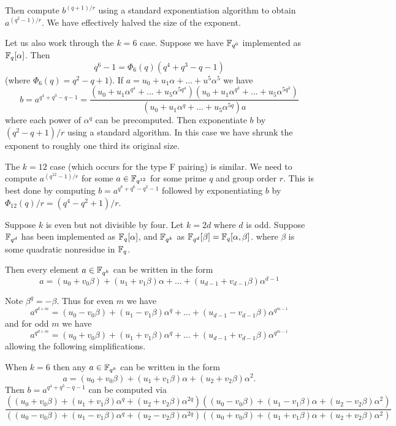 Then compute $b^{(q+1)/r}$ using a standard exponentiation algorithm
to obtain $a^{(q^2-1)/r}$. We have effectively halved the size of the exponent.

Let us also work through the $k = 6$ case. Suppose we have $\mathbb{F}_{q^6}$
implemented as $\mathbb{F}_q[\alpha]$. Then
\[ q^6 - 1 = \Phi_6(q) (q^4 + q^3 - q - 1)\]
(where $\Phi_6(q) = q^2 - q + 1$).
If $a = u_0 + u_1 \alpha + ... + u^5 \alpha^5$ we have
\[ b =
a^{q^4 + q^3 - q - 1}
= \frac{
(u_0 + u_1 \alpha^{q^4} + ... + u_5 \alpha^{5q^4})
(u_0 + u_1 \alpha^{q^3} + ... + u_5 \alpha^{5q^3})}
{
(u_0 + u_1 \alpha^q + ... + u_5 \alpha^{5q})a
}
\]
where each power of $\alpha^q$ can be precomputed. Then exponentiate $b$
by $(q^2 - q + 1)/r$ using a standard algorithm.
In this case we have shrunk the exponent to roughly one third its original
size.

The $k=12$ case (which occurs for the type F pairing) is similar.
We need to compute $a^{(q^12-1)/r}$ for some $a \in \mathbb{F}_{q^{12}}$
for some prime $q$ and group order $r$.
This is best done by computing $b=a^{q^8 +q^6 -q^2 -1}$ followed by
exponentiating $b$ by $\Phi_{12}(q)/r = (q^4 - q^2 + 1)/r$.

Suppose $k$ is even but not divisible by four.
Let $k = 2 d$ where $d$ is odd. Suppose
$\mathbb{F}_{q^d}$ has been implemented as $\mathbb{F}_q[\alpha]$, and $\mathbb{F}_{q^k}$ as
$\mathbb{F}_{q^d}[\beta] = \mathbb{F}_q[\alpha, \beta]$.
where $\beta$ is some quadratic nonresidue in $\mathbb{F}_q$.

Then every element $a\in \mathbb{F}_{q^k}$ can be written in the form
\[ a = (u_0 + v_0 \beta)
+ (u_1 + v_1 \beta) \alpha
+ ... + (u_{d-1} + v_{d-1} \beta) \alpha^{d-1} \]

Note $\beta^q = -\beta$.
Thus for even $m$ we have
\[ a^{q^{d + m}} = (u_0 - v_0 \beta)
+ (u_1 - v_1 \beta) \alpha^q
+ ... + (u_{d-1} - v_{d-1} \beta) \alpha^{q^{m-1}} \]
and for odd $m$ we have
\[ a^{q^{d + m}} = (u_0 + v_0 \beta)
+ (u_1 + v_1 \beta) \alpha^q
+ ... + (u_{d-1} + v_{d-1} \beta) \alpha^{q^{m-1}} \]
allowing the following simplifications.

When $k=6$ then any $a \in \mathbb{F}_{q^k}$ can be written in the form
\[ a = (u_0 + v_0 \beta)
+ (u_1 + v_1 \beta) \alpha
+ (u_2 + v_2 \beta) \alpha^2 . \]
Then $b = a^{q^4 + q^3 - q - 1}$
can be computed via
\[
\frac
{
\left(
(u_0 + v_0 \beta)
+ (u_1 + v_1 \beta) \alpha^q
+ (u_2 + v_2 \beta) \alpha^{2q}
\right)
\left(
(u_0 - v_0 \beta)
+ (u_1 - v_1 \beta) \alpha
+ (u_2 - v_2 \beta) \alpha^2
\right)
}
{
\left(
(u_0 - v_0 \beta)
+ (u_1 - v_1 \beta) \alpha^q
+ (u_2 - v_2 \beta) \alpha^{2q}
\right)
\left(
(u_0 + v_0 \beta)
+ (u_1 + v_1 \beta) \alpha
+ (u_2 + v_2 \beta) \alpha^2
\right)
}
\]

